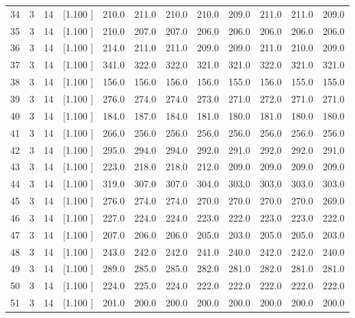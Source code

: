 \documentclass[12pt,a4paper]{article}
\begin{document}
\begin{center}
{\begin{tabular}{r r r r r r r r r r r r}
  34&  3& 14&[1.100     ]&   210.0&   211.0&   210.0&   210.0&   209.0&   211.0&   211.0&   209.0\\[-0.02in]
  35&  3& 14&[1.100     ]&   210.0&   207.0&   207.0&   206.0&   206.0&   206.0&   206.0&   206.0\\[-0.02in]
  36&  3& 14&[1.100     ]&   214.0&   211.0&   211.0&   209.0&   209.0&   211.0&   210.0&   209.0\\[-0.02in]
  37&  3& 14&[1.100     ]&   341.0&   322.0&   322.0&   321.0&   321.0&   322.0&   321.0&   321.0\\[-0.02in]
  38&  3& 14&[1.100     ]&   156.0&   156.0&   156.0&   156.0&   155.0&   156.0&   155.0&   155.0\\[-0.02in]
  39&  3& 14&[1.100     ]&   276.0&   274.0&   274.0&   273.0&   271.0&   272.0&   271.0&   271.0\\[-0.02in]
  40&  3& 14&[1.100     ]&   184.0&   187.0&   184.0&   181.0&   180.0&   181.0&   180.0&   180.0\\[-0.02in]
  41&  3& 14&[1.100     ]&   266.0&   256.0&   256.0&   256.0&   256.0&   256.0&   256.0&   256.0\\[-0.02in]
  42&  3& 14&[1.100     ]&   295.0&   294.0&   294.0&   292.0&   291.0&   292.0&   292.0&   291.0\\[-0.02in]
  43&  3& 14&[1.100     ]&   223.0&   218.0&   218.0&   212.0&   209.0&   209.0&   209.0&   209.0\\[-0.02in]
  44&  3& 14&[1.100     ]&   319.0&   307.0&   307.0&   304.0&   303.0&   303.0&   303.0&   303.0\\[-0.02in]
  45&  3& 14&[1.100     ]&   276.0&   274.0&   274.0&   270.0&   270.0&   270.0&   270.0&   269.0\\[-0.02in]
  46&  3& 14&[1.100     ]&   227.0&   224.0&   224.0&   223.0&   222.0&   223.0&   223.0&   222.0\\[-0.02in]
  47&  3& 14&[1.100     ]&   207.0&   206.0&   206.0&   205.0&   203.0&   205.0&   205.0&   203.0\\[-0.02in]
  48&  3& 14&[1.100     ]&   243.0&   242.0&   242.0&   241.0&   240.0&   242.0&   242.0&   240.0\\[-0.02in]
  49&  3& 14&[1.100     ]&   289.0&   285.0&   285.0&   282.0&   281.0&   282.0&   281.0&   281.0\\[-0.02in]
  50&  3& 14&[1.100     ]&   224.0&   225.0&   224.0&   222.0&   222.0&   222.0&   222.0&   222.0\\[-0.02in]
  51&  3& 14&[1.100     ]&   201.0&   200.0&   200.0&   200.0&   200.0&   200.0&   200.0&   200.0\\[-0.02in]

\end{tabular}}
\end{center}
\end{document}
